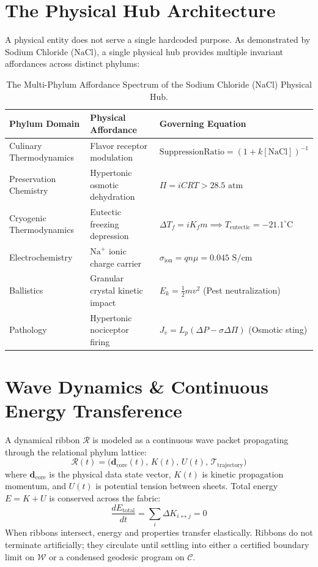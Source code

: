 \documentclass[11pt,a4paper]{article}
\begin{document}
\section{The Physical Hub Architecture}

A physical entity does not serve a single hardcoded purpose. As demonstrated by Sodium Chloride ($\text{NaCl}$), a single physical hub provides multiple invariant affordances across distinct phylums:
\begin{table}[h!]
\centering
\begin{tabular}{@{}lll@{}}
\toprule
\textbf{Phylum Domain} & \textbf{Physical Affordance} & \textbf{Governing Equation} \\
\midrule
Culinary Thermodynamics & Flavor receptor modulation & $\text{SuppressionRatio} = (1 + k[\text{NaCl}])^{-1}$ \\
Preservation Chemistry & Hypertonic osmotic dehydration & $\Pi = iCRT > 28.5\text{ atm}$ \\
Cryogenic Thermodynamics & Eutectic freezing depression & $\Delta T_f = i K_f m \implies T_{\text{eutectic}} = -21.1^\circ\text{C}$ \\
Electrochemistry & $\text{Na}^+$ ionic charge carrier & $\sigma_{\text{ion}} = q n \mu = 0.045\text{ S/cm}$ \\
Ballistics & Granular crystal kinetic impact & $E_k = \frac{1}{2} m v^2$ (Pest neutralization) \\
Pathology & Hypertonic nociceptor firing & $J_v = L_p (\Delta P - \sigma \Delta \Pi)$ (Osmotic sting) \\
\bottomrule
\end{tabular}
\caption{The Multi-Phylum Affordance Spectrum of the Sodium Chloride ($\text{NaCl}$) Physical Hub.}
\end{table}

\section{Wave Dynamics \& Continuous Energy Transference}

A dynamical ribbon $\mathcal{R}$ is modeled as a continuous wave packet propagating through the relational phylum lattice:
\begin{equation}
    \mathcal{R}(t) = \big(\mathbf{d}_{\text{core}}(t), \,K(t), \,U(t), \,\mathcal{T}_{\text{trajectory}}\big)
\end{equation}
where $\mathbf{d}_{\text{core}}$ is the physical data state vector, $K(t)$ is kinetic propagation momentum, and $U(t)$ is potential tension between sheets. Total energy $E = K + U$ is conserved across the fabric:
\begin{equation}
    \frac{dE_{\text{total}}}{dt} = \sum_i \Delta K_{i \leftrightarrow j} = 0
\end{equation}
When ribbons intersect, energy and properties transfer elastically. Ribbons do not terminate artificially; they circulate until settling into either a certified boundary limit on $\mathcal{W}$ or a condensed geodesic program on $\mathcal{C}$.
\end{document}
